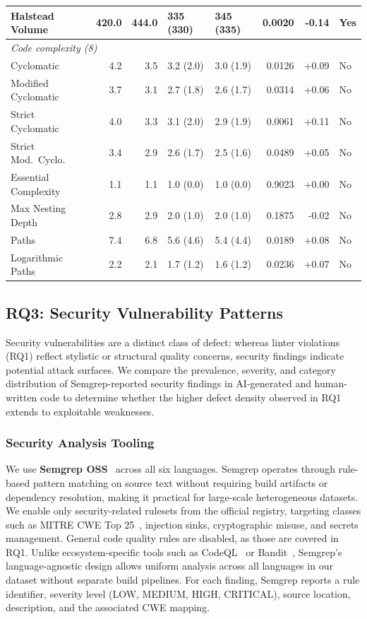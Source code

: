 \begin{table}[t!]
{\begin{tabular}{l rr ll rrl}
Halstead Volume        & 420.0 & 444.0 & 335 (330)     & 345 (335)     & \textbf{0.0020} & -0.14 & Yes \\
\midrule
\multicolumn{8}{l}{\textit{Code complexity (8)}} \\
Cyclomatic             & 4.2 & 3.5 & 3.2 (2.0) & 3.0 (1.9) & 0.0126 & +0.09 & No  \\
Modified Cyclomatic    & 3.7 & 3.1 & 2.7 (1.8) & 2.6 (1.7) & 0.0314 & +0.06 & No  \\
Strict Cyclomatic      & 4.0 & 3.3 & 3.1 (2.0) & 2.9 (1.9) & 0.0061 & +0.11 & No  \\
Strict Mod.\ Cyclo.    & 3.4 & 2.9 & 2.6 (1.7) & 2.5 (1.6) & 0.0489 & +0.05 & No  \\
Essential Complexity   & 1.1 & 1.1 & 1.0 (0.0) & 1.0 (0.0) & 0.9023 & +0.00 & No  \\
Max Nesting Depth      & 2.8 & 2.9 & 2.0 (1.0) & 2.0 (1.0) & 0.1875 & -0.02 & No  \\
Paths                  & 7.4 & 6.8 & 5.6 (4.6) & 5.4 (4.4) & 0.0189 & +0.08 & No  \\
Logarithmic Paths      & 2.2 & 2.1 & 1.7 (1.2) & 1.6 (1.2) & 0.0236 & +0.07 & No  \\
\bottomrule
\end{tabular}%
}
\end{table}

\subsection{RQ3: Security Vulnerability Patterns}
\label{sec:results-rq3}

Security vulnerabilities are a distinct class of defect: whereas linter violations (RQ1) reflect stylistic or structural quality concerns, security findings indicate potential attack surfaces. We compare the prevalence, severity, and category distribution of Semgrep-reported security findings in AI-generated and human-written code to determine whether the higher defect density observed in RQ1 extends to exploitable weaknesses.

\subsubsection{Security Analysis Tooling}

We use \textbf{Semgrep OSS}~\cite{Semgrep} across all six languages. Semgrep operates through rule-based pattern matching on source text without requiring build artifacts or dependency resolution, making it practical for large-scale heterogeneous datasets. We enable only security-related rulesets from the official registry, targeting classes such as MITRE CWE Top 25~\cite{cwe2024}, injection sinks, cryptographic misuse, and secrets management. General code quality rules are disabled, as those are covered in RQ1. Unlike ecosystem-specific tools such as CodeQL~\cite{codeql2024} or Bandit~\cite{bandit2024}, Semgrep's language-agnostic design allows uniform analysis across all languages in our dataset without separate build pipelines. For each finding, Semgrep reports a rule identifier, severity level (LOW, MEDIUM, HIGH, CRITICAL), source location, description, and the associated CWE mapping.

